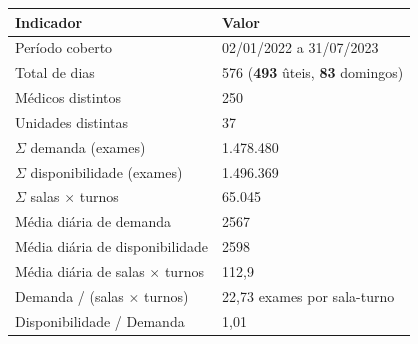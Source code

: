 \begin{tabular}{|M{5cm}|M{5cm}|}
\hline
\textbf{Indicador} & \textbf{Valor} \\
\hline\hline
Per\'iodo coberto & 02/01/2022 a 31/07/2023 \\
\hline
Total de dias & 576 (\textbf{493} \^{u}teis, \textbf{83} domingos) \\
\hline
M\'edicos distintos & 250 \\
\hline
Unidades distintas & 37 \\
\hline
$\Sigma$ demanda (exames) & 1.478.480 \\
\hline
$\Sigma$ disponibilidade (exames) & 1.496.369 \\
\hline
$\Sigma$ salas $\times$ turnos & 65.045 \\
\hline
M\'edia di\'aria de demanda & 2567 \\
\hline
M\'edia di\'aria de disponibilidade & 2598 \\
\hline
M\'edia di\'aria de salas $\times$ turnos & 112{,}9 \\
\hline
Demanda / (salas $\times$ turnos) & 22{,}73 exames por sala-turno \\
\hline
Disponibilidade / Demanda & 1{,}01 \\
\hline
\end{tabular}

